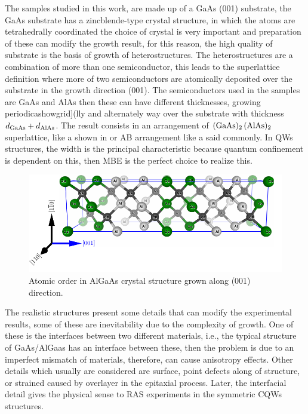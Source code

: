The samples studied in this work, are made up of a GaAs (001) substrate, the GaAs substrate has a zincblende-type crystal structure, in which the atoms are tetrahedrally coordinated  the choice of crystal is very important and preparation of these can modify the growth result, for this reason, the high quality of substrate is the basis of growth of heterostructures. The heterostructures are a combination of more than one semiconductor, this leads to the superlattice definition where more of two semiconductors are atomically deposited over the substrate in the growth direction (001).  The semiconductors used in the samples are GaAs and AlAs then these can have different thicknesses, growing periodicashowgrid](lly and alternately way over the substrate with thickness $d_{\displaystyle\text{\scriptsize GaAs}}+d_{\displaystyle\text{\scriptsize AlAs}}$. The result consists in an arrangement of $(\displaystyle\text{\normalfont GaAs})_{2}\,(\displaystyle\text{\normalfont AlAs})_{2}$ superlattice,  like a  shown in   or AB arrangement like a said commonly. In QWs structures, the width is the principal characteristic because quantum confinement is dependent on this, then MBE is the perfect choice to realize this.  


\begin{figure}[H]
	\centering
	\includegraphics[width=\textwidth]{../figures/chapter-3/crystal-2/build/crystal-2.pdf}
	\caption[AlGaAs superlattice]{Atomic order in AlGaAs crystal structure grown  along (001) direction. }
	\label{fig:chapter-3 AlGaAs Cell}
\end{figure}

The realistic structures present some details that can modify the experimental results, some of these are inevitability due to the complexity of growth. One of these is the interfaces between two different materials, i.e., the typical structure of GaAs/AlGaas has an interface between these, then the problem is due to an imperfect mismatch of materials, therefore, can cause anisotropy effects. Other details which usually are considered are surface, point defects along of structure, or strained caused by overlayer in the epitaxial process.  Later, the interfacial detail gives the physical sense to RAS experiments in the symmetric CQWs structures. 


